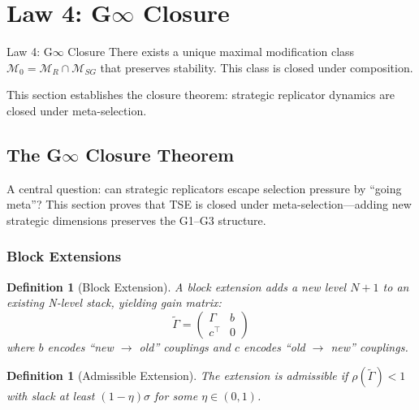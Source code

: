 \documentclass[12pt]{article}
\newtheorem{definition}[theorem]{Definition}
\begin{document}



\section{Law 4: G$\infty$ Closure}
\label{sec:law4}

\begin{lawbox}{Law 4: G$\infty$ Closure}
There exists a unique maximal modification class $\mathcal{M}_0 = \mathcal{M}_R \cap \mathcal{M}_{SG}$ that preserves stability. This class is closed under composition.
\end{lawbox}

This section establishes the closure theorem: strategic replicator dynamics are closed under meta-selection.

\subsection{The G$\infty$ Closure Theorem}
\label{sec:g-infinity}

A central question: can strategic replicators escape selection pressure by ``going meta''? This section proves that TSE is closed under meta-selection---adding new strategic dimensions preserves the G1--G3 structure.

\subsubsection{Block Extensions}

\begin{definition}[Block Extension]
A \emph{block extension} adds a new level $N+1$ to an existing N-level stack, yielding gain matrix:
\[
\tilde{\Gamma} = \begin{pmatrix} \Gamma & b \\ c^\top & 0 \end{pmatrix}
\]
where $b$ encodes ``new $\to$ old'' couplings and $c$ encodes ``old $\to$ new'' couplings.
\end{definition}

\begin{definition}[Admissible Extension]
The extension is \emph{admissible} if $\rho(\tilde{\Gamma}) < 1$ with slack at least $(1 - \eta)\sigma$ for some $\eta \in (0, 1)$.
\end{definition}
\end{document}
